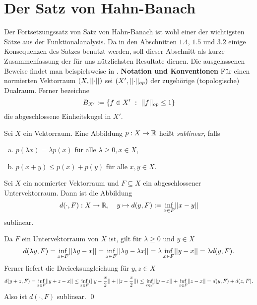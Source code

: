 \section{Der Satz von Hahn-Banach}
Der Fortsetzungssatz von Satz von Hahn-Banach ist wohl einer der wichtigsten Sätze aus der Funktionalanalysis. 
Da in den Abschnitten $1.4$, $1.5$ und $3.2$ einige Konsequenzen des Satzes benutzt werden, soll dieser Abschnitt als kurze Zusammenfassung der für uns nützlichsten Resultate dienen. 
Die ausgelassenen Beweise findet man beispielsweise in \cite[Kapitel III.1]{werner}. \newpage
\textbf{Notation und Konventionen}\newline
Für einen normierten Vektorraum $(X, \lvert\lvert \cdot \rvert\rvert)$ sei $(X', \lvert\lvert \cdot \rvert\rvert_{op})$ der zugehörige (topologische) Dualraum. Ferner bezeichne
$$
    B_{X'} := \{f \in X' \ : \ \lvert\lvert f \rvert\rvert_{op} \leq 1 \}
$$
die abgeschlossene Einheitskugel in $X'$. 

\begin{mydef}
    Sei $X$ ein Vektorraum. Eine Abbildung $p:X \to \mathbb{R}$ heißt \textit{sublinear}, falls
    \begin{enumerate}[(a)]
        \item $p(\lambda x) = \lambda p(x)$ für alle $\lambda \geq 0, x \in X$,
        \item $p(x+y) \leq p(x) + p(y)$ für alle $x,y \in X$. 
    \end{enumerate}
\end{mydef}

\begin{proposition}
    Sei $X$ ein normierter Vektorraum und $F \subseteq X$ ein abgeschlossener Untervektorraum. Dann ist die Abbildung
    $$
        d(\cdot, F):X \to \mathbb{R}, \quad y \mapsto d(y,F) := \inf_{x \in F}\lvert\lvert x-y \rvert\rvert
    $$
    sublinear. 
\end{proposition}

\begin{proof*}
    Da $F$ ein Untervektorraum von $X$ ist, gilt für $\lambda \geq 0$ und $y \in X$ 
    $$
        d(\lambda y, F) = \inf_{x \in F}\lvert\lvert \lambda y - x \rvert\rvert = \inf_{x \in F}\lvert\lvert \lambda y - \lambda x \rvert\rvert = \lambda \inf_{x \in F}\lvert\lvert y-x \rvert\rvert = \lambda d(y,F). 
    $$
    Ferner liefert die Dreiecksungleichung für $y,z \in X$
    $$
        d(y+z,F) = \inf_{x \in F}\lvert\lvert y+z - x \rvert\rvert \leq \inf_{x \in F}(\lvert\lvert y - \frac{x}{2} \rvert\rvert + \lvert\lvert z - \frac{x}{2} \rvert\rvert) \leq \inf_{x \in F}\lvert\lvert y-x \rvert\rvert + \inf_{x \in F}\lvert\lvert z-x \rvert\rvert = d(y,F) + d(z,F). 
    $$
    Also ist $d(\cdot, F)$ sublinear. \qed 
\end{proof*}

